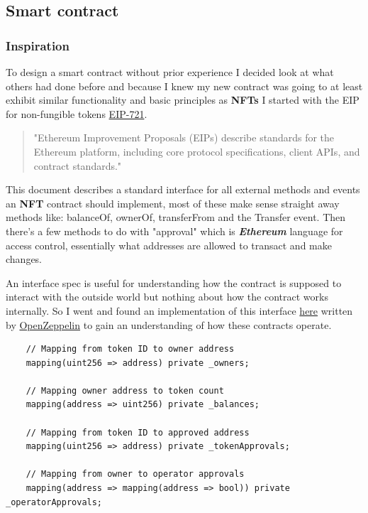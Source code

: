 \documentclass[12pt]{article}
\newcommand{\keyword}[1]{\textbf{\textit{#1}}}
\begin{document}
\subsection{Smart contract}

\subsubsection{Inspiration}

To design a smart contract without prior experience I decided look at what others had done before and because I knew my new contract was going to at least exhibit similar functionality and basic principles as \textbf{NFTs} I started with the EIP for non-fungible tokens \href{https://eips.ethereum.org/EIPS/eip-721}{EIP-721}. 

\begin{quote}
"Ethereum Improvement Proposals (EIPs) describe standards for the Ethereum platform, including core protocol specifications, client APIs, and contract standards."\cite{eip}
\end{quote}

This document describes a standard interface for all external methods and events an \textbf{NFT} contract should implement, most of these make sense straight away methods like: balanceOf, ownerOf, transferFrom and the Transfer event. Then there's a few methods to do with "approval" which is \keyword{Ethereum} language for access control, essentially what addresses are allowed to transact and make changes.

An interface spec is useful for understanding how the contract is supposed to interact with the outside world but nothing about how the contract works internally. So I went and found an implementation of this interface \href{https://github.com/OpenZeppelin/openzeppelin-contracts/blob/master/contracts/token/ERC721/ERC721.sol}{here} written by \href{https://github.com/OpenZeppelin}{OpenZeppelin} to gain an understanding of how these contracts operate.

\begin{verbatim}
	// Mapping from token ID to owner address
	mapping(uint256 => address) private _owners;

	// Mapping owner address to token count
	mapping(address => uint256) private _balances;

	// Mapping from token ID to approved address
	mapping(uint256 => address) private _tokenApprovals;

	// Mapping from owner to operator approvals
	mapping(address => mapping(address => bool)) private _operatorApprovals;
\end{verbatim}
\end{document}
